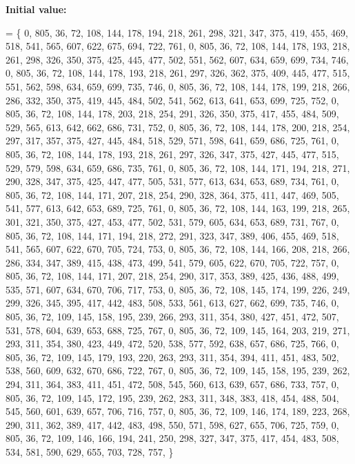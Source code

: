 {\bfseries Initial value\+:}
\begin{DoxyCode}
= \{
    0, 805, 36, 72, 108, 144, 178, 194, 218, 261, 298, 321, 347, 375, 419, 455, 469, 518, 541, 565, 607, 
      622, 675, 694, 722, 761, 
    0, 805, 36, 72, 108, 144, 178, 193, 218, 261, 298, 326, 350, 375, 425, 445, 477, 502, 551, 562, 607, 
      634, 659, 699, 734, 746, 
    0, 805, 36, 72, 108, 144, 178, 193, 218, 261, 297, 326, 362, 375, 409, 445, 477, 515, 551, 562, 598, 
      634, 659, 699, 735, 746, 
    0, 805, 36, 72, 108, 144, 178, 199, 218, 266, 286, 332, 350, 375, 419, 445, 484, 502, 541, 562, 613, 
      641, 653, 699, 725, 752, 
    0, 805, 36, 72, 108, 144, 178, 203, 218, 254, 291, 326, 350, 375, 417, 455, 484, 509, 529, 565, 613, 
      642, 662, 686, 731, 752, 
    0, 805, 36, 72, 108, 144, 178, 200, 218, 254, 297, 317, 357, 375, 427, 445, 484, 518, 529, 571, 598, 
      641, 659, 686, 725, 761, 
    0, 805, 36, 72, 108, 144, 178, 193, 218, 261, 297, 326, 347, 375, 427, 445, 477, 515, 529, 579, 598, 
      634, 659, 686, 735, 761, 
    0, 805, 36, 72, 108, 144, 171, 194, 218, 271, 290, 328, 347, 375, 425, 447, 477, 505, 531, 577, 613, 
      634, 653, 689, 734, 761, 
    0, 805, 36, 72, 108, 144, 171, 207, 218, 254, 290, 328, 364, 375, 411, 447, 469, 505, 541, 577, 613, 
      642, 653, 689, 725, 761, 
    0, 805, 36, 72, 108, 144, 163, 199, 218, 265, 301, 321, 350, 375, 427, 453, 477, 502, 531, 579, 605, 
      634, 653, 689, 731, 767, 
    0, 805, 36, 72, 108, 144, 171, 194, 218, 272, 291, 323, 347, 389, 406, 455, 469, 518, 541, 565, 607, 
      622, 670, 705, 724, 753, 
    0, 805, 36, 72, 108, 144, 166, 208, 218, 266, 286, 334, 347, 389, 415, 438, 473, 499, 541, 579, 605, 
      622, 670, 705, 722, 757, 
    0, 805, 36, 72, 108, 144, 171, 207, 218, 254, 290, 317, 353, 389, 425, 436, 488, 499, 535, 571, 607, 
      634, 670, 706, 717, 753, 
    0, 805, 36, 72, 108, 145, 174, 199, 226, 249, 299, 326, 345, 395, 417, 442, 483, 508, 533, 561, 613, 
      627, 662, 699, 735, 746, 
    0, 805, 36, 72, 109, 145, 158, 195, 239, 266, 293, 311, 354, 380, 427, 451, 472, 507, 531, 578, 604, 
      639, 653, 688, 725, 767, 
    0, 805, 36, 72, 109, 145, 164, 203, 219, 271, 293, 311, 354, 380, 423, 449, 472, 520, 538, 577, 592, 
      638, 657, 686, 725, 766, 
    0, 805, 36, 72, 109, 145, 179, 193, 220, 263, 293, 311, 354, 394, 411, 451, 483, 502, 538, 560, 609, 
      632, 670, 686, 722, 767, 
    0, 805, 36, 72, 109, 145, 158, 195, 239, 262, 294, 311, 364, 383, 411, 451, 472, 508, 545, 560, 613, 
      639, 657, 686, 733, 757, 
    0, 805, 36, 72, 109, 145, 172, 195, 239, 262, 283, 311, 348, 383, 418, 454, 488, 504, 545, 560, 601, 
      639, 657, 706, 716, 757, 
    0, 805, 36, 72, 109, 146, 174, 189, 223, 268, 290, 311, 362, 389, 417, 442, 483, 498, 550, 571, 598, 
      627, 655, 706, 725, 759, 
    0, 805, 36, 72, 109, 146, 166, 194, 241, 250, 298, 327, 347, 375, 417, 454, 483, 508, 534, 581, 590, 
      629, 655, 703, 728, 757, 
\}
\end{DoxyCode}
\mbox{\label{data___t_p_8_c_ad697eda381bd4db7c98115bdabf13e22}} 

